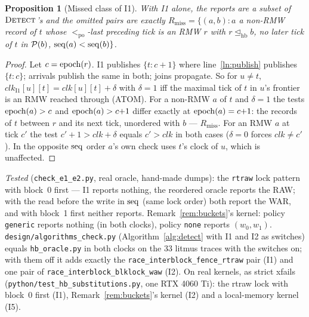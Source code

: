 \documentclass[11pt]{article}
\newtheorem{proposition}[theorem]{Proposition}
\theoremstyle{remark}
\newcommand{\PO}{<_{\mathrm{po}}}\newcommand{\HB}{\to_{\mathrm{hb}}}\newcommand{\HBr}{\trianglelefteq_{\mathrm{hb}}}
\newcommand{\clk}{\mathit{clk}}\newcommand{\Bk}{B}\newcommand{\Ch}{\mathit{Ch}}\newcommand{\lastr}{\mathit{last}}
\begin{document}
\begin{proposition}[Missed class of I1]\label{prop:rmiss}
With I1 alone, the reports are a subset of $\textsc{Detect}$'s and the omitted pairs are
exactly $R_{\mathrm{miss}}=\{(a,b): a$ a non-RMW record of $t$ whose $\PO$-last preceding
tick is an RMW $r$ with $r\HBr b$, no later tick of $t$ in $\mathcal{P}(b)$, $\operatorname{seq}(a)<\operatorname{seq}(b)\}$.
\end{proposition}
\begin{proof}
Let $c=\operatorname{epoch}(r)$. I1 publishes $\{t:c{+}1\}$ where line~\ref{ln:publish} publishes
$\{t:c\}$; arrivals publish the same in both; joins propagate. So for $u\ne t$,
$\clk_{\mathrm{I1}}[u][t]=\clk[u][t]+\delta$ with $\delta=1$ iff the maximal tick of $t$ in
$u$'s frontier is an RMW reached through (ATOM). For a non-RMW $a$ of $t$ and $\delta=1$
the tests $\operatorname{epoch}(a)>c$ and $\operatorname{epoch}(a)>c{+}1$ differ exactly at $\operatorname{epoch}(a)=c{+}1$: the
records of $t$ between $r$ and its next tick, unordered with $b$ --- $R_{\mathrm{miss}}$.
For an RMW $a$ at tick $c'$ the test $c'{+}1>\clk+\delta$ equals $c'>\clk$ in both cases
($\delta=0$ forces $\clk\ne c'$). In the opposite $\operatorname{seq}$ order $a$'s own check uses $t$'s
clock of $u$, which is unaffected.
\end{proof}
\noindent\emph{Tested} (\texttt{check\_e1\_e2.py}, real oracle, hand-made dumps): the
\texttt{rtraw} lock pattern with block~0 first --- I1 reports nothing, the reordered oracle
reports the RAW; with the read before the write in $\operatorname{seq}$ (same lock order) both report
the WAR, and with block~1 first neither reports. Remark~\ref{rem:buckets}'s kernel:
policy \texttt{generic} reports nothing (in both clocks), policy \texttt{none} reports
$(w_0,w_1)$. \texttt{design/algorithms\_check.py} (Algorithm~\ref{alg:detect} with I1 and I2
as switches) equals \texttt{hb\_oracle.py} in both clocks on the 33 litmus traces with the
switches on; with them off it adds exactly the \texttt{race\_interblock\_fence\_rtraw} pair
(I1) and one pair of \texttt{race\_interblock\_blklock\_waw} (I2). On real kernels, as strict
xfails (\texttt{python/test\_hb\_substitutions.py}, one RTX 4060 Ti): the rtraw lock with
block~0 first (I1), Remark~\ref{rem:buckets}'s kernel (I2) and a local-memory kernel (I5).
\end{document}
